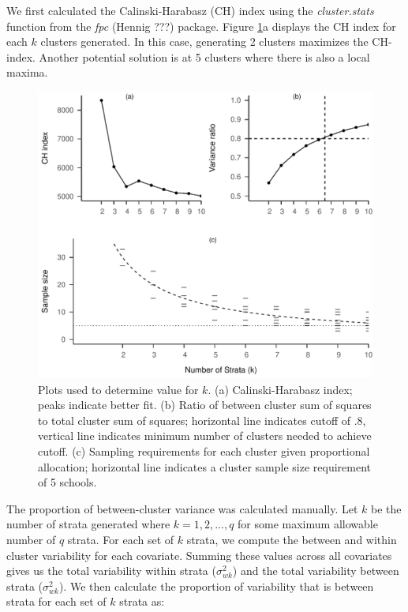 \documentclass[
  english,
  man,floatsintext]{apa6}
\begin{document}
We first calculated the Calinski-Harabasz (CH) index using the \emph{cluster.stats} function from the \emph{fpc} (Hennig ???) package. Figure \ref{fig:fig-k-plots}a displays the CH index for each \(k\) clusters generated. In this case, generating 2 clusters maximizes the CH-index. Another potential solution is at 5 clusters where there is also a local maxima.

\begin{figure}[tbp]
\includegraphics[width=1\linewidth]{GenSamp-Paper_files/figure-latex/fig-k-plots-1} \caption{Plots used to determine value for $k$. (a) Calinski-Harabasz index; peaks indicate better fit. (b) Ratio of between cluster sum of squares to total cluster sum of squares; horizontal line indicates cutoff of .8, vertical line indicates minimum number of clusters needed to achieve cutoff. (c) Sampling requirements for each cluster given proportional allocation; horizontal line indicates a cluster sample size requirement of 5 schools.}\label{fig:fig-k-plots}
\end{figure}

The proportion of between-cluster variance was calculated manually. Let \(k\) be the number of strata generated where \(k = 1, 2, ..., q\) for some maximum allowable number of \(q\) strata. For each set of \(k\) strata, we compute the between and within cluster variability for each covariate. Summing these values across all covariates gives us the total variability within strata (\(\sigma_{wk}^2\)) and the total variability between strata (\(\sigma_{wk}^2\)). We then calculate the proportion of variability that is between strata for each set of \(k\) strata as:
\end{document}
